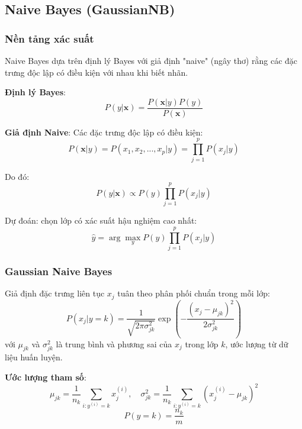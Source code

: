 ﻿\documentclass{article}
\begin{document}
\subsection{Naive Bayes (GaussianNB)}

\subsubsection*{Nền tảng xác suất}
Naive Bayes dựa trên định lý Bayes với giả định "naive" (ngây thơ) rằng các đặc trưng độc lập có điều kiện với nhau khi biết nhãn.

\textbf{Định lý Bayes}:
\begin{equation}
P(y|\mathbf{x}) = \frac{P(\mathbf{x}|y)P(y)}{P(\mathbf{x})}
\end{equation}

\textbf{Giả định Naive}: Các đặc trưng độc lập có điều kiện:
\begin{equation}
P(\mathbf{x}|y) = P(x_1, x_2, ..., x_p|y) = \prod_{j=1}^{p}P(x_j|y)
\end{equation}

Do đó:
\begin{equation}
P(y|\mathbf{x}) \propto P(y)\prod_{j=1}^{p}P(x_j|y)
\end{equation}

Dự đoán: chọn lớp có xác suất hậu nghiệm cao nhất:
\begin{equation}
\hat{y} = \arg\max_{y} P(y)\prod_{j=1}^{p}P(x_j|y)
\end{equation}

\subsubsection*{Gaussian Naive Bayes}
Giả định đặc trưng liên tục $x_j$ tuân theo phân phối chuẩn trong mỗi lớp:
\begin{equation}
P(x_j|y=k) = \frac{1}{\sqrt{2\pi\sigma_{jk}^2}}\exp\left(-\frac{(x_j - \mu_{jk})^2}{2\sigma_{jk}^2}\right)
\end{equation}
với $\mu_{jk}$ và $\sigma_{jk}^2$ là trung bình và phương sai của $x_j$ trong lớp $k$, ước lượng từ dữ liệu huấn luyện.

\textbf{Ước lượng tham số}:
\begin{equation}
\mu_{jk} = \frac{1}{n_k}\sum_{i: y^{(i)}=k}x_j^{(i)}, \quad \sigma_{jk}^2 = \frac{1}{n_k}\sum_{i: y^{(i)}=k}(x_j^{(i)} - \mu_{jk})^2
\end{equation}
\begin{equation}
P(y=k) = \frac{n_k}{m}
\end{equation}
\end{document}
